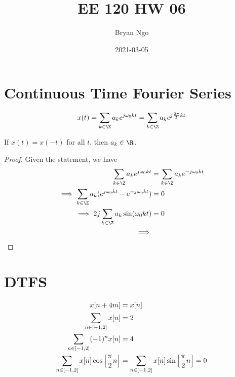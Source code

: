 \documentclass{article}
\title{EE 120 HW 06}
\author{Bryan Ngo}
\date{2021-03-05}
\begin{document}
\maketitle

\section{Continuous Time Fourier Series}

\begin{equation}
    x(t) = \sum_{k \in \Z} a_k e^{j \omega_0 k t} = \sum_{k \in \Z} a_k e^{j \frac{2\pi}{T} kt}
\end{equation}

\begin{theorem}
    If \(x(t) = x(-t)\) for all \(t\), then \(a_k \in \R\).
\end{theorem}
\begin{proof}
    Given the statement, we have
    \begin{align}
        \sum_{k \in \Z} a_k e^{j \omega_0 k t} &= \sum_{k \in \Z} a_k e^{-j \omega_0 k t} \\
        \implies \sum_{k \in \Z} a_k (e^{j \omega_0 k t} - e^{-j \omega_0 k t}) &= 0 \\
        \implies 2j \sum_{k \in \Z} a_k \sin(\omega_0 k t) &= 0 \\
        \implies
    \end{align}
\end{proof}

\section{DTFS}

\begin{align}
    x[n + 4m] &= x[n] \\
    \sum_{n \in [-1, 2]} x[n] &= 2 \\
    \sum_{n \in [-1, 2]} (-1)^n x[n] &= 4 \\
    \sum_{n \in [-1, 2]} x[n] \cos\qty[\frac{\pi}{2} n] &= \sum_{n \in [-1, 2]} x[n] \sin\qty[\frac{\pi}{2} n] = 0
\end{align}

\subsection{}
\end{document}
